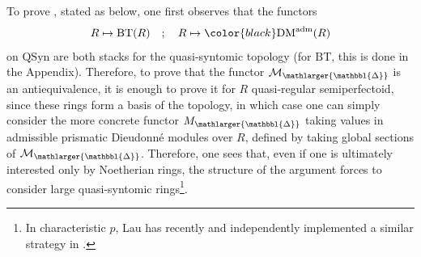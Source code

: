 \documentclass{amsart}
\newcommand{\prism}{{\mathlarger{\mathbbl{\Delta}}}}
\theoremstyle{plain}
\theoremstyle{definition}
\newcommand{\red}[1]{{\color{black} #1}}
\begin{document}
To prove , stated as  below, one first observes that the functors 
\[ R \mapsto \mathrm{BT}(R) \quad ; \quad R \mapsto \red{\mathrm{DM}^{\rm adm}(R)} \]
on $\mathrm{QSyn}$ are both stacks for the quasi-syntomic topology (for $\mathrm{BT}$, this is done in the Appendix). Therefore, to prove that the functor \red{$\mathcal{M}_{\prism}$} is an antiequivalence, it is enough to prove it for $R$ quasi-regular semiperfectoid, since these rings form a basis of the topology, in which case one can simply consider the more concrete functor \red{$M_{\prism}$} taking values in \red{admissible} prismatic Dieudonn\'e modules over $R$, defined by taking global sections of \red{$\mathcal{M}_{\prism}$}. Therefore, one sees that, even if one is ultimately interested only by Noetherian rings, the structure of the argument forces to consider large quasi-syntomic rings\footnote{In characteristic $p$, Lau has recently and independently implemented a similar strategy in \cite{lau_divided_dieudonne_crystals}.}.
\end{document}
